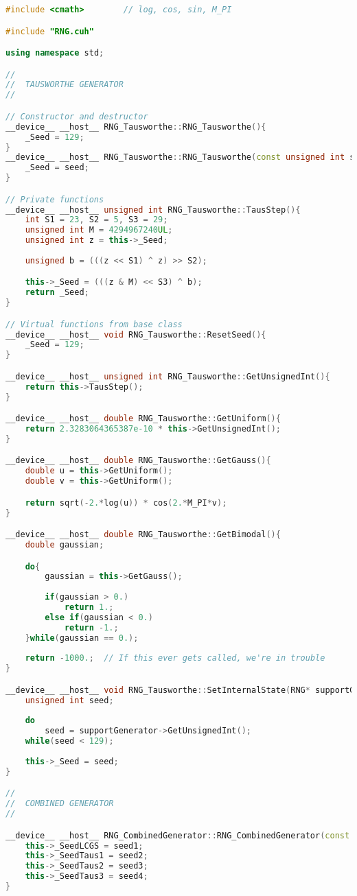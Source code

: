 \begin{lstlisting}[language=C++, caption={\texttt{libraries/CoreLibraries/RandomGenerator/RNG.cu}}]
#include <cmath>		// log, cos, sin, M_PI

#include "RNG.cuh"

using namespace std;

//
//	TAUSWORTHE GENERATOR
//

// Constructor and destructor
__device__ __host__ RNG_Tausworthe::RNG_Tausworthe(){
	_Seed = 129;
}
__device__ __host__ RNG_Tausworthe::RNG_Tausworthe(const unsigned int seed){
	_Seed = seed;
}

// Private functions
__device__ __host__ unsigned int RNG_Tausworthe::TausStep(){
	int S1 = 23, S2 = 5, S3 = 29;
	unsigned int M = 4294967240UL;
	unsigned int z = this->_Seed;
	
	unsigned b = (((z << S1) ^ z) >> S2);

	this->_Seed = (((z & M) << S3) ^ b);
	return _Seed;		
}

// Virtual functions from base class
__device__ __host__ void RNG_Tausworthe::ResetSeed(){
	_Seed = 129;	
}

__device__ __host__ unsigned int RNG_Tausworthe::GetUnsignedInt(){
	return this->TausStep();
}

__device__ __host__ double RNG_Tausworthe::GetUniform(){
	return 2.3283064365387e-10 * this->GetUnsignedInt();	
}

__device__ __host__ double RNG_Tausworthe::GetGauss(){
	double u = this->GetUniform();
	double v = this->GetUniform();

	return sqrt(-2.*log(u)) * cos(2.*M_PI*v);	
}

__device__ __host__ double RNG_Tausworthe::GetBimodal(){
	double gaussian;

	do{
		gaussian = this->GetGauss();
		
		if(gaussian > 0.)
			return 1.;
		else if(gaussian < 0.)
			return -1.;
	}while(gaussian == 0.);
	
	return -1000.;	// If this ever gets called, we're in trouble
}

__device__ __host__ void RNG_Tausworthe::SetInternalState(RNG* supportGenerator){
	unsigned int seed;
	
	do
		seed = supportGenerator->GetUnsignedInt();
	while(seed < 129);
	
	this->_Seed = seed;
}

//
//	COMBINED GENERATOR
//

__device__ __host__ RNG_CombinedGenerator::RNG_CombinedGenerator(const unsigned int seed1, const unsigned int seed2, const unsigned int seed3, const unsigned int seed4){
	this->_SeedLCGS = seed1;
	this->_SeedTaus1 = seed2;
	this->_SeedTaus2 = seed3;
	this->_SeedTaus3 = seed4;
}


\end{lstlisting}
